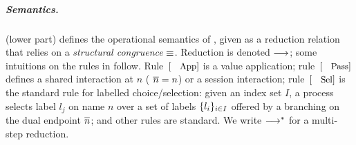 \documentclass[a4paper,UKenglish]{lipics}
\theoremstyle{definition}
\begin{document}
 \subparagraph{Semantics.}
	 (lower part) defines the operational semantics 
of \HOp, given as
a reduction relation that relies 
on 
a \emph{structural congruence} $\equiv$. %
Reduction is denoted $\longrightarrow$; some intuitions on the rules in  %
follow.
Rule~$\orule{App}$ is a value application; 
rule~$\orule{Pass}$ defines a shared interaction at $n$ 
( $\overline{n}=n$) or a session interaction;  
rule~$\orule{Sel}$ is the standard rule for labelled choice/selection:
given an index set $I$, 
a process selects label $l_j$ on name $n$ over a set of
labels $\{l_i\}_{i \in I}$ offered by a branching 
on the dual endpoint $\overline{n}$; and other rules are standard.
We write $\longrightarrow^\ast$ for a multi-step reduction. 
\end{document}
